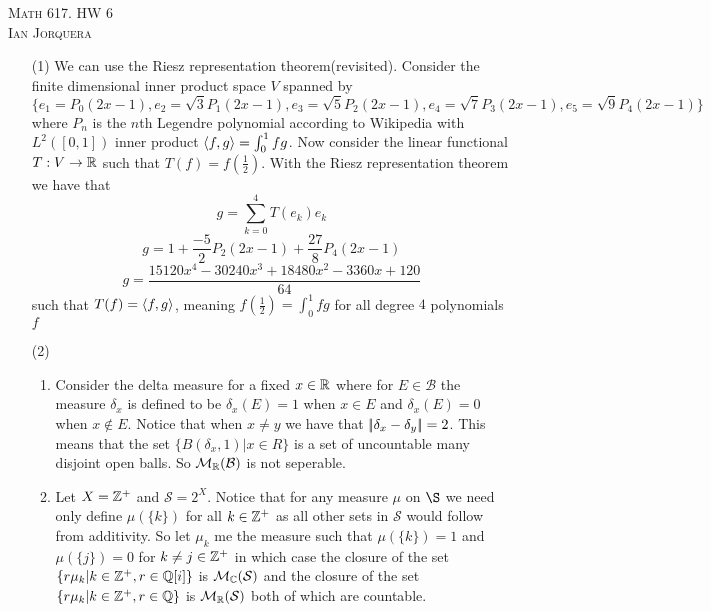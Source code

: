 \documentclass[12pt]{amsart}
\begin{document}
\begin{center}
   \textsc{Math 617. HW 6\\ Ian Jorquera}
\end{center}
\vspace{1em}

\begin{itemize}
    \item[(1)] We can use the Riesz representation theorem(revisited). 
    Consider the finite dimensional inner product space $V$ spanned by 
    \[\{e_1=P_0(2x-1),e_2=\sqrt{3}P_1(2x-1),e_3=\sqrt{5}P_2(2x-1),e_4=\sqrt{7}P_3(2x-1),e_5=\sqrt{9}P_4(2x-1)\}\] where $P_n$ is the $n$th 
    Legendre polynomial according to Wikipedia with $L^2([0,1])$ inner product $\left\langle f,g \right\rangle=\int_0^1fg$.
    Now consider the linear functional $T:V\rightarrow\mathbb{R}$ such that $T(f)=f(\frac{1}{2})$.
    With the Riesz representation theorem we have that 
    \[g=\sum_{k=0}^4T(e_k)e_k\]
    \[g=1+\frac{-5}{2}P_2(2x-1)+\frac{27}{8}P_4(2x-1)\]
    \[g=\frac{15120x^4-30240x^3+18480x^2-3360x+120}{64}\]
    such that $T(f)=\left\langle f,g \right\rangle$, meaning $f(\frac{1}{2})=\int_0^1fg$ for all degree $4$ polynomials $f$
    \item[(2)] 
    \begin{enumerate}[label=(\alph*)]
        \item Consider the delta measure for a fixed $x\in \mathbb{R}$ where 
        for $E\in\mathcal B$ the measure $\delta_x$ is 
        defined to be $\delta_x(E)=1$ when $x\in E$ and 
        $\delta_x(E)=0$ when $x\not\in E$. Notice that when $x\neq y$ we have that
         $\norm{\delta_x-\delta_y}=2$. This means that the set $\{B(\delta_x,1)|x\in R\}$ is a 
         set of uncountable many disjoint open balls. So $\mathcal M_{\mathbb{R}}(\mathcal B)$ is not seperable.
        \item Let $X=\mathbb{Z}^+$ and $\mathcal{S}=2^X$. Notice that for any measure $\mu$
        on $\S$ we need only define $\mu(\{k\})$ for all $k\in \mathbb{Z}^+$ as 
        all other sets in $\mathcal S$ would follow from additivity.
        So let $\mu_k$ me the measure such that $\mu(\{k\})=1$ and 
        $\mu(\{j\})=0$ for $k\neq j\in\mathbb{Z}^+$ in which case the closure of the 
        set $\{r\mu_k | k\in\mathbb{Z}^+, r\in\mathbb{Q}[i]\}$ is $\mathcal M_{\mathbb{C}}(\mathcal S)$ and
        the closure of the 
        set $\{r\mu_k | k\in\mathbb{Z}^+, r\in\mathbb{Q}\}$ is $\mathcal M_{\mathbb{R}}(\mathcal S)$ both of which are countable.


\end{enumerate}
\end{itemize}
\end{document}
